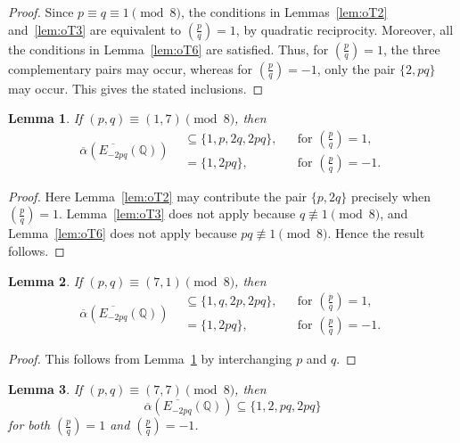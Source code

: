 \documentclass[12pt]{amsart}
\newcommand{\bbQ}{\mathbb{Q}}
\newcommand{\legendre}[2]{\genfrac{(}{)}{}{}{#1}{#2}}
\numberwithin{equation}{section}
\newtheorem{lem}{Lemma}[section]
\theoremstyle{definition}
\begin{document}
\begin{proof}
Since $p\equiv q\equiv1\pmod8$, the conditions in Lemmas~\ref{lem:oT2}
and~\ref{lem:oT3} are equivalent to $\legendre{p}{q}=1$, by quadratic
reciprocity. Moreover, all the conditions in Lemma~\ref{lem:oT6} are satisfied.
Thus, for $\legendre{p}{q}=1$, the three complementary pairs may occur, whereas
for $\legendre{p}{q}=-1$, only the pair $\{2,pq\}$ may occur. This gives the
stated inclusions.
\end{proof}


\begin{lem}
\label{lem:oalpha_1.2} 
If $(p,q)\equiv (1,7)\pmod 8$, then
\[
\overline{\alpha}\left(\overline{E_{-2pq}}(\bbQ)\right)
\begin{aligned}
    &\subseteq \{1,p,2q,2pq\},
&& \text{for } \legendre{p}{q}=1,\\
&= \{1,2pq\},
&& \text{for } \legendre{p}{q}=-1.
\end{aligned}
\]
\end{lem}

\begin{proof}
Here Lemma~\ref{lem:oT2} may contribute the pair $\{p,2q\}$ precisely when
$\legendre{p}{q}=1$. Lemma~\ref{lem:oT3} does not apply because
$q\not\equiv1\pmod8$, and Lemma~\ref{lem:oT6} does not apply because
$pq\not\equiv1\pmod8$. Hence the result follows.
\end{proof}


\begin{lem}
\label{lem:oalpha_1.3} 
If $(p,q)\equiv (7,1)\pmod 8$, then
\[
\overline{\alpha}\left(\overline{E_{-2pq}}(\bbQ)\right)
\begin{aligned}
&\subseteq \{1,q,2p,2pq\},
&& \text{for } \legendre{p}{q}=1,\\
&= \{1,2pq\},
&& \text{for } \legendre{p}{q}=-1.
\end{aligned}
\]
\end{lem}


\begin{proof}
This follows from Lemma~\ref{lem:oalpha_1.2} by interchanging $p$ and $q$.
\end{proof}

\begin{lem}
\label{lem:oalpha_1.4} 
If $(p,q)\equiv (7,7)\pmod 8$, then
\[
\overline{\alpha}\left(\overline{E_{-2pq}}(\bbQ)\right)
\subseteq \{1,2,pq,2pq\}
\]
for both $\legendre{p}{q}=1$ and $\legendre{p}{q}=-1$.
\end{lem}
\end{document}
